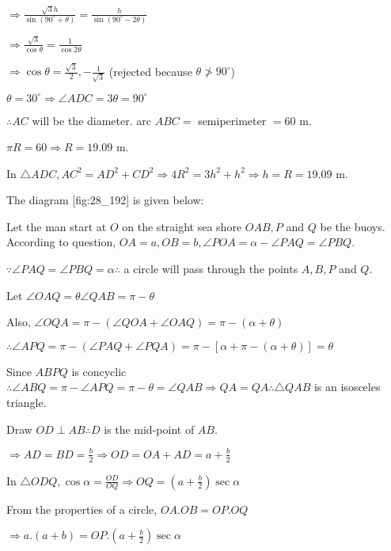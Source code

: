   $\Rightarrow \frac{\sqrt{3}h}{\sin(90^\circ + \theta)} = \frac{h}{\sin(90^\circ - 2\theta)}$

  $\Rightarrow \frac{\sqrt{3}}{\cos\theta} = \frac{1}{\cos2\theta}$

  $\Rightarrow \cos\theta = \frac{\sqrt{3}}{2}, -\frac{1}{\sqrt{3}}$ (rejected because
  $\theta \ngtr 90^\circ$)

  $\theta = 30^\circ \Rightarrow \angle ADC = 3\theta = 90^\circ$

  $\therefore AC$ will be the diameter. arc $ABC =$ semiperimeter $= 60$ m.

  $\pi R = 60 \Rightarrow R = 19.09$ m.

  In $\triangle ADC, AC^2 = AD^2 + CD^2 \Rightarrow 4R^2 = 3h^2 + h^2 \Rightarrow h = R = 19.09$ m.

\item The diagram [fig:28_192] is given below:

  \startplacefigure[reference=fig:28_192]
    \externalfigure[28_192.pdf]
  \stopplacefigure

  Let the man start at $O$ on the straight sea shore $OAB, P$ and $Q$ be the
  buoys. According to question, $OA = a, OB = b, \angle POA = \alpha - \angle PAQ = \angle PBQ$.

  $\because\angle PAQ = \angle PBQ = \alpha \therefore$ a circle will pass through the points
  $A, B, P$ and $Q$.

  Let $\angle OAQ = \theta \angle QAB = \pi - \theta$

  Also, $\angle OQA = \pi - (\angle QOA + \angle OAQ) = \pi - (\alpha + \theta)$

  $\therefore \angle APQ = \pi - (\angle PAQ + \angle PQA) = \pi - [\alpha + \pi - (\alpha +
    \theta)] = \theta$

  Since $ABPQ$ is concyclic $\therefore \angle ABQ = \pi - \angle APQ = \pi - \theta = \angle
  QAB \Rightarrow QA = QA \therefore \triangle QAB$ is an isosceles triangle.

  Draw $OD\perp AB \therefore D$ is the mid-point of $AB$.

  $\Rightarrow AD = BD = \frac{b}{2}\Rightarrow OD = OA + AD = a + \frac{b}{2}$

  In $\triangle ODQ, \cos\alpha = \frac{OD}{OQ} \Rightarrow OQ = \left(a +
  \frac{b}{2}\right)\sec\alpha$

  From the properties of a circle, $OA.OB = OP.OQ$

  $\Rightarrow a.(a + b) = OP.\left(a + \frac{b}{2}\right)\sec\alpha$

